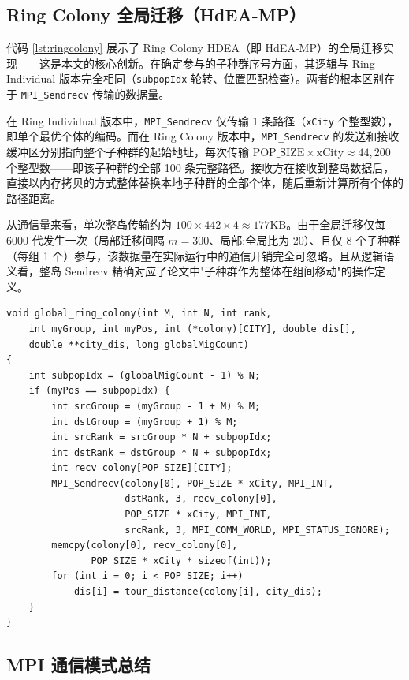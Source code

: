 \subsection{Ring Colony 全局迁移（HdEA-MP）}

代码 \ref{lst:ringcolony} 展示了 Ring Colony HDEA（即 HdEA-MP）的全局迁移实现——这是本文的核心创新。在确定参与的子种群序号方面，其逻辑与 Ring Individual 版本完全相同（\texttt{subpopIdx} 轮转、位置匹配检查）。两者的根本区别在于 \texttt{MPI\_Sendrecv} 传输的数据量。

在 Ring Individual 版本中，\texttt{MPI\_Sendrecv} 仅传输 1 条路径（\texttt{xCity} 个整型数），即单个最优个体的编码。而在 Ring Colony 版本中，\texttt{MPI\_Sendrecv} 的发送和接收缓冲区分别指向整个子种群的起始地址，每次传输 $\text{POP\_SIZE} \times \text{xCity} \approx 44,200$ 个整型数——即该子种群的全部 100 条完整路径。接收方在接收到整岛数据后，直接以内存拷贝的方式整体替换本地子种群的全部个体，随后重新计算所有个体的路径距离。

从通信量来看，单次整岛传输约为 $100 \times 442 \times 4 \approx 177\text{KB}$。由于全局迁移仅每 6000 代发生一次（局部迁移间隔 $m=300$、局部:全局比为 20）、且仅 8 个子种群（每组 1 个）参与，该数据量在实际运行中的通信开销完全可忽略。且从逻辑语义看，整岛 Sendrecv 精确对应了论文中"子种群作为整体在组间移动"的操作定义。

\begin{lstlisting}[caption={Ring Colony 全局迁移——移动种群（整岛 Sendrecv）},label={lst:ringcolony}]
void global_ring_colony(int M, int N, int rank,
    int myGroup, int myPos, int (*colony)[CITY], double dis[],
    double **city_dis, long globalMigCount)
{
    int subpopIdx = (globalMigCount - 1) % N;
    if (myPos == subpopIdx) {
        int srcGroup = (myGroup - 1 + M) % M;
        int dstGroup = (myGroup + 1) % M;
        int srcRank = srcGroup * N + subpopIdx;
        int dstRank = dstGroup * N + subpopIdx;
        int recv_colony[POP_SIZE][CITY];
        MPI_Sendrecv(colony[0], POP_SIZE * xCity, MPI_INT,
                     dstRank, 3, recv_colony[0],
                     POP_SIZE * xCity, MPI_INT,
                     srcRank, 3, MPI_COMM_WORLD, MPI_STATUS_IGNORE);
        memcpy(colony[0], recv_colony[0],
               POP_SIZE * xCity * sizeof(int));
        for (int i = 0; i < POP_SIZE; i++)
            dis[i] = tour_distance(colony[i], city_dis);
    }
}
\end{lstlisting}

\subsection{MPI 通信模式总结}

